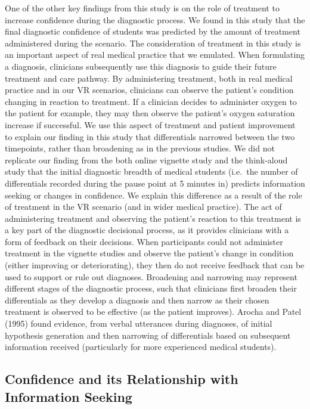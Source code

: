 \documentclass[a4paper, nobind]{templates/ociamthesis}
\begin{document}
One of the other key findings from this study is on the role of treatment to increase confidence during the diagnostic process. We found in this study that the final diagnostic confidence of students was predicted by the amount of treatment administered during the scenario. The consideration of treatment in this study is an important aspect of real medical practice that we emulated. When formulating a diagnosis, clinicians subsequently use this diagnosis to guide their future treatment and care pathway. By administering treatment, both in real medical practice and in our VR scenarios, clinicians can observe the patient's condition changing in reaction to treatment. If a clinician decides to administer oxygen to the patient for example, they may then observe the patient's oxygen saturation increase if successful. We use this aspect of treatment and patient improvement to explain our finding in this study that differentials narrowed between the two timepoints, rather than broadening as in the previous studies. We did not replicate our finding from the both online vignette study and the think-aloud study that the initial diagnostic breadth of medical students (i.e.~the number of differentials recorded during the pause point at 5 minutes in) predicts information seeking or changes in confidence. We explain this difference as a result of the role of treatment in the VR scenario (and in wider medical practice). The act of administering treatment and observing the patient's reaction to this treatment is a key part of the diagnostic decisional process, as it provides clinicians with a form of feedback on their decisions. When participants could not administer treatment in the vignette studies and observe the patient's change in condition (either improving or deteriorating), they then do not receive feedback that can be used to support or rule out diagnoses. Broadening and narrowing may represent different stages of the diagnostic process, such that clinicians first broaden their differentials as they develop a diagnosis and then narrow as their chosen treatment is observed to be effective (as the patient improves). Arocha and Patel (1995) found evidence, from verbal utterances during diagnoses, of initial hypothesis generation and then narrowing of differentials based on subsequent information received (particularly for more experienced medical students).

\subsection{Confidence and its Relationship with Information Seeking}\label{confidence-and-its-relationship-with-information-seeking}
\end{document}

